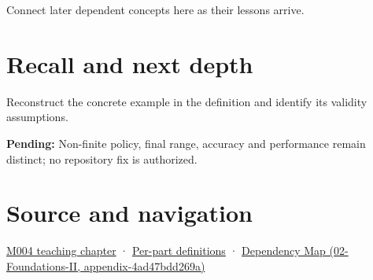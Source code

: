 Connect later dependent concepts here as their lessons arrive.

\section{Recall and next depth}\label{appendix-7f1e17dcafb1-recall-and-next-depth}

Reconstruct the concrete example in the definition and identify its validity assumptions.

\textbf{Pending:} Non-finite policy, final range, accuracy and performance remain distinct; no repository fix is authorized.

\section{Source and navigation}\label{appendix-7f1e17dcafb1-source-and-navigation}

\href{Continuous\%20Notes/Computing\%20Foundations\%20-\%20From\%20Bits\%20to\%20C++\%20and\%20Systems\%20APIs\#A\%20stretching\%20ruler\%20for\%20real-valued\%20quantities}{M004 teaching chapter} · \hyperref[appendix-fd090d982a15-m004---parts-61-76]{Per-part definitions} · \href{../02-Foundations-II/main.pdf\#nameddest=appendix-4ad47bdd269a}{Dependency Map (02-Foundations-II, appendix-4ad47bdd269a)}
